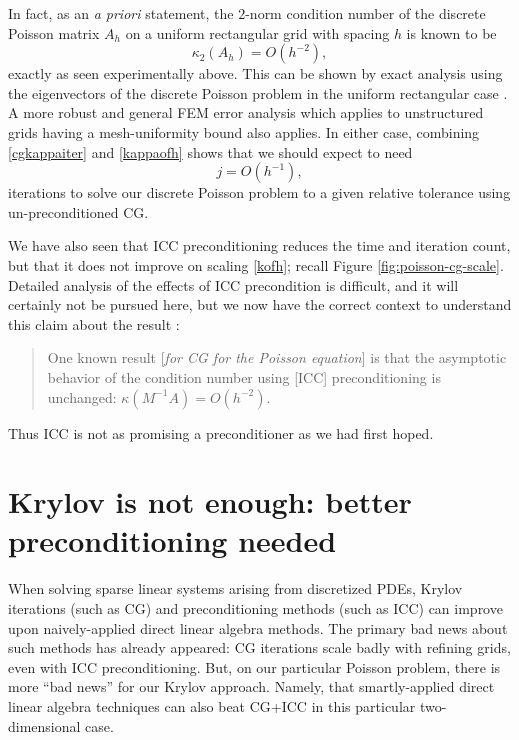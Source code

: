 In fact, as an \emph{a priori} statement, the $2$-norm condition number of the discrete Poisson matrix $A_h$ on a uniform rectangular grid with spacing $h$ is known to be
\begin{equation}
    \kappa_2(A_h) = O(h^{-2}), \label{kappaofh}
\end{equation}
exactly as seen experimentally above.  This can be shown by exact analysis using the eigenvectors of the discrete Poisson problem in the uniform rectangular case \citep{Briggsetal2000}.  A more robust and general FEM error analysis which applies to unstructured grids having a mesh-uniformity bound \citep{Elmanetal2005} also applies.  In either case, combining \eqref{cgkappaiter} and \eqref{kappaofh} shows that we should expect to need
\begin{equation}
    j = O(h^{-1}), \label{kofh}
\end{equation}
iterations to solve our discrete Poisson problem to a given relative tolerance using un-preconditioned CG.

We have also seen that ICC preconditioning reduces the time and iteration count, but that it does not improve on scaling \eqref{kofh}; recall Figure \ref{fig:poisson-cg-scale}.  Detailed analysis of the effects of ICC precondition is difficult, and it will certainly not be pursued here, but we now have the correct context to understand this claim about the result \citet[][p.~82]{Elmanetal2005}:
\begin{quote}
One known result [\emph{for CG for the Poisson equation}] is that the asymptotic behavior of the condition number using [ICC] preconditioning is unchanged: $\kappa(M^{-1} A) = O(h^{-2})$.
\end{quote}
Thus ICC is not as promising a preconditioner as we had first hoped.


\section{Krylov is not enough: better preconditioning needed}

When solving sparse linear systems arising from discretized PDEs, Krylov iterations (such as CG) and preconditioning methods (such as ICC) can improve upon naively-applied direct linear algebra methods.  The primary bad news about such methods has already appeared: CG iterations scale badly with refining grids, even with ICC preconditioning.  But, on our particular Poisson problem, there is more ``bad news'' for our Krylov approach.  Namely, that smartly-applied direct linear algebra techniques can also beat CG+ICC in this particular two-dimensional case.


